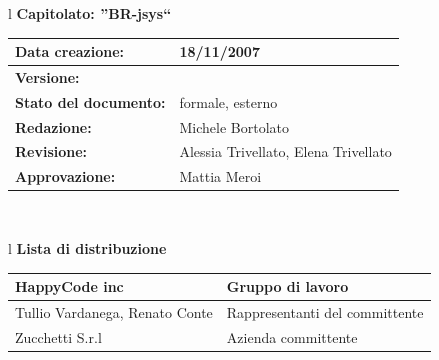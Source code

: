 \documentclass[11pt,titlepage,a4paper]{report}
\begin{document}
\begin{center}
\thispagestyle{plain}
\begin{table}[htbp]
\large{
\begin{tabular}{l}
\Large{\textbf{\textsf{Capitolato: ''BR-jsys``}}} \\
\begin{tabular}{||p{4cm}||p{6cm}||} \hline
\textbf{Data creazione:} & 18/11/2007 \\ \hline
\textbf{Versione:} & \lv \\ \hline
\textbf{Stato del documento:} & formale, esterno \\ \hline
\textbf{Redazione:} & Michele Bortolato \\ \hline
\textbf{Revisione:} & Alessia Trivellato, Elena Trivellato  \\ \hline
\textbf{Approvazione:}  & Mattia Meroi \\ \hline
\end{tabular} \\
\end{tabular}
}
\end{table}
\end{center}

\begin{center}
\begin{table}[hbtp]
\large{
\begin{tabular}{l}
\Large{\textbf{\textsf{Lista di distribuzione}}} \\
\begin{tabular}{||p{4cm}||p{6cm}||} \hline
{HappyCode inc}& Gruppo di lavoro\\ \hline
{Tullio Vardanega, Renato Conte}& Rappresentanti del committente \\ \hline 
{Zucchetti S.r.l}& Azienda committente\\ \hline
\end{tabular} \\
\end{tabular}
}
\end{table}
\end{center}
\end{document}
